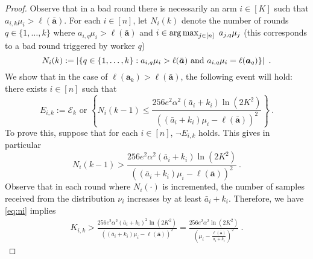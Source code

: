 \begin{proof}
	\noindent Observe that in a bad round there is necessarily an arm $i \in [K]$ such that $a_{i,k} \mu_i > \ell(\bar{\bm{a}})$. For each $i\in [n]$, let $N_i(k)$ denote the number of rounds $q\in \{1,\dots, k\}$ where $a_{i,q} \mu_i > \ell(\bar{\bm{a}})$ and $i \in \operatorname*{arg\,max}_{j \in [n]} \ a_{j,q} \mu_j$ (this corresponds to a bad round triggered by worker $q$)
	$$
	N_i(k) := \left| \left\lbrace q \in \{1, \dots, k\}: a_{i,q}\mu_i > \ell(\bar{\bm{a}}) \text{ and } a_{i,q}\mu_i = \ell(\bm{a}_q) \right\rbrace \right|~.
	$$
	We show that in the case of $\ell(\bm{a}_k) > \ell(\bar{\bm{a}})$, the following event will hold: there exists $i \in [n]$ such that 
	$$
	E_{i,k} := \mathcal{E}_k \text{ or }\left\lbrace N_i(k-1) \le  \frac{256e^2\alpha^2 (\bar{a}_i+k_i) \ln(2K^2)}{\left((\bar{a}_i+k_i)\mu_i - \ell(\bar{\bm{a}})\right)^2}  \right\rbrace~.
	$$
	To prove this, suppose that for each $i \in [n]$, $\neg E_{i,k}$ holds. This gives in particular
	\begin{equation}\label{eq:ni}
		N_i(k-1) > \frac{256e^2\alpha^2 (\bar{a}_i+k_i) \ln(2K^2)}{\left((\bar{a}_i+k_i)\mu_i - \ell(\bar{\bm{a}})\right)^2}~.
	\end{equation}
	Observe that in each round where $N_i(\cdot)$ is incremented, the number of samples received from the distribution $\nu_i$ increases by at least $\bar{a}_{i}+k_i$. 
	Therefore, we have \eqref{eq:ni} implies
	\begin{align*}
		K_{i,k}
		> \frac{256e^2\alpha^2(\bar{a}_i+k_i)^2 \ln(2K^2)}{\left((\bar{a}_i+k_i)\mu_i - \ell(\bar{\bm{a}})\right)^2}
		= \frac{256e^2\alpha^2 \ln(2K^2)}{\left(\mu_i - \frac{\ell(\bar{\bm{a}})}{\bar{a}_i+k_i}\right)^2}~.
	\end{align*}
	

\end{proof}
